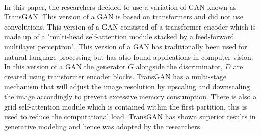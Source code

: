 \\ 
In this paper, the researchers decided to use a variation of GAN known as TransGAN.  This version of a GAN is based on  transformers and did not use convolutions.  This version of a GAN consisted of a transformer encoder which is made up of a "multi-head self-attention module stacked by a feed-forward multilayer perceptron"\cite{litReviewLychee}.  This version of a GAN has traditionally been used for natural language processing but has also found applications in computer vision.  In this version of a GAN the generator $G$ alongside the discriminator, $D$ are created using transformer encoder blocks.  TransGAN has a multi-stage mechanism that will adjust the image resolution by upscaling and downscaling the image accordingly to prevent excessive memory consumption.  There is also a grid self-attention module which is contained within the first partition,  this is used to reduce the computational load.  TransGAN has shown superior results in generative modeling and hence was adopted by the researchers.\cite{litReviewLychee}\cite{litReviewTransGanResults}

